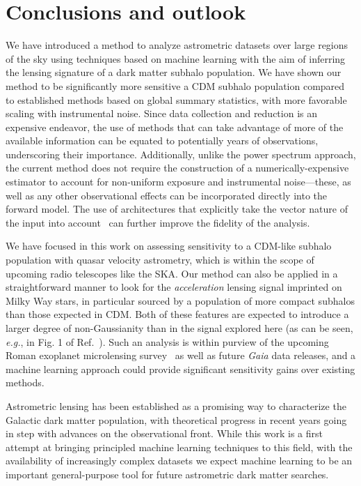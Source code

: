 \documentclass[]{article}
\begin{document}
\section{Conclusions and outlook}
\label{sec:conclusions}

We have introduced a method to analyze astrometric datasets over large regions of the sky using techniques based on machine learning with the aim of inferring the lensing signature of a dark matter subhalo population. We have shown our method to be significantly more sensitive a CDM subhalo population compared to established methods based on global summary statistics, with more favorable scaling with instrumental noise. Since data collection and reduction is an expensive endeavor, the use of methods that can take advantage of more of the available information can be equated to potentially years of observations, underscoring their importance. Additionally, unlike the power spectrum approach, the current method does not require the construction of a numerically-expensive estimator to account for non-uniform exposure and instrumental noise---these, as well as any other observational effects can be incorporated directly into the forward model. The use of architectures that explicitly take the vector nature of the input into account~\cite{esteves2020spinweighted} can further improve the fidelity of the analysis.

We have focused in this work on assessing sensitivity to a CDM-like subhalo population with quasar velocity astrometry, which is within the scope of upcoming radio telescopes like the SKA. Our method can also be applied in a straightforward manner to look for the \emph{acceleration} lensing signal imprinted on Milky Way stars, in particular sourced by a population of more compact subhalos than those expected in CDM. Both of these features are expected to introduce a larger degree of non-Gaussianity than in the signal explored here (as can be seen, \emph{e.g.}, in Fig. 1 of Ref.~\cite{Mishra-Sharma:2020ynk}). Such an analysis is within purview of the upcoming Roman exoplanet microlensing survey~\cite{Pardo:2021uzy} as well as future \emph{Gaia} data releases, and a machine learning approach could provide significant sensitivity gains over existing methods. 

Astrometric lensing has been established as a promising way to characterize the Galactic dark matter population, with theoretical progress in recent years going in step with advances on the observational front. While this work is a first attempt at bringing principled machine learning techniques to this field, with the availability of increasingly complex datasets we expect machine learning to be an important general-purpose tool for future astrometric dark matter searches.
\end{document}
